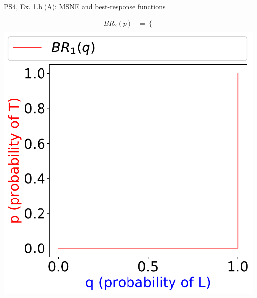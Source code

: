 \begin{frame}{PS4, Ex. 1.b (A): MSNE and best-response functions}
\begin{multicols}{2}
\begin{align*}
      BR_2(p)&=\left\{\right.\\
    \end{align*}
    \vspace{-8pt}
    \includegraphics[width=\columnwidth]{figures/1b_}
  \vfill\null
  \end{multicols}
\end{frame}
